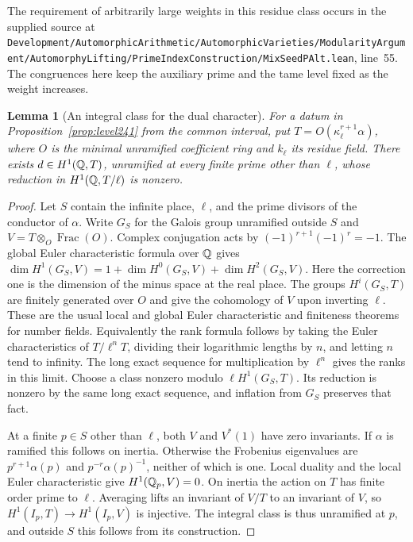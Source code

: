 \documentclass[a4paper,11pt]{article}
\newtheorem{lemma}[proposition]{Lemma}
\theoremstyle{definition}
\theoremstyle{remark}
\newcommand{\srcloc}[2]{{\small\nolinkurl{#1.lean}}, line~#2}
\numberwithin{equation}{section}
\begin{document}
The requirement of arbitrarily large weights in this residue
class occurs in the supplied source at
\srcloc{Development/AutomorphicArithmetic/AutomorphicVarieties/ModularityArgument/AutomorphyLifting/PrimeIndexConstruction/MixSeedPAlt}{55}.
The congruences here keep the auxiliary prime and the tame
level fixed as the weight increases.

\begin{lemma}[An integral class for the dual character]
\label{lem:dual241}
For a datum in Proposition~\ref{prop:level241} from the common
interval, put \(T=O(\kappa_\ell^{r+1}\alpha)\), where \(O\)
is the minimal unramified coefficient ring and \(k_\ell\) its
residue field. There exists \(d\in H^1(\mathbb Q,T)\), unramified
at every finite prime other than \(\ell\), whose reduction
in \(H^1(\mathbb Q,T/\ell)\) is nonzero.
\end{lemma}
\begin{proof}
Let \(S\) contain the infinite place, \(\ell\), and the prime
divisors of the conductor of \(\alpha\). Write \(G_S\) for the
Galois group unramified outside \(S\) and \(V=T\otimes_O
\operatorname{Frac}(O)\). Complex conjugation acts by
\((-1)^{r+1}(-1)^r=-1\). The global Euler characteristic
formula over \(\mathbb Q\) gives
\(\dim H^1(G_S,V)=1+\dim H^0(G_S,V)+\dim H^2(G_S,V)\).
Here the correction one is the dimension of the minus space
at the real place. The groups \(H^i(G_S,T)\) are finitely
generated over \(O\) and give the cohomology of \(V\) upon
inverting \(\ell\). These are the usual local and global
Euler characteristic and finiteness theorems for number
fields. \cite[I, Sections~2, 4 and 5]{VII-V-V-milne98}
Equivalently the rank formula follows by taking the
Euler characteristics of \(T/\ell^nT\), dividing their
logarithmic lengths by \(n\), and letting \(n\) tend to
infinity. The long exact sequence for multiplication by
\(\ell^n\) gives the ranks in this limit.
Choose a class nonzero modulo \(\ell H^1(G_S,T)\).
Its reduction is nonzero by the same long exact sequence,
and inflation from \(G_S\) preserves that fact.

At a finite \(p\in S\) other than \(\ell\), both \(V\)
and \(V^*(1)\) have zero invariants. If \(\alpha\) is ramified
this follows on inertia. Otherwise the Frobenius eigenvalues
are \(p^{r+1}\alpha(p)\) and \(p^{-r}\alpha(p)^{-1}\),
neither of which is one. Local duality and the local Euler
characteristic give \(H^1(\mathbb Q_p,V)=0\). On inertia the
action on \(T\) has finite order prime to \(\ell\).
Averaging lifts an invariant of \(V/T\) to an invariant
of \(V\), so \(H^1(I_p,T)\to H^1(I_p,V)\) is injective.
The integral class is thus unramified at \(p\), and outside
\(S\) this follows from its construction.
\end{proof}
\end{document}
